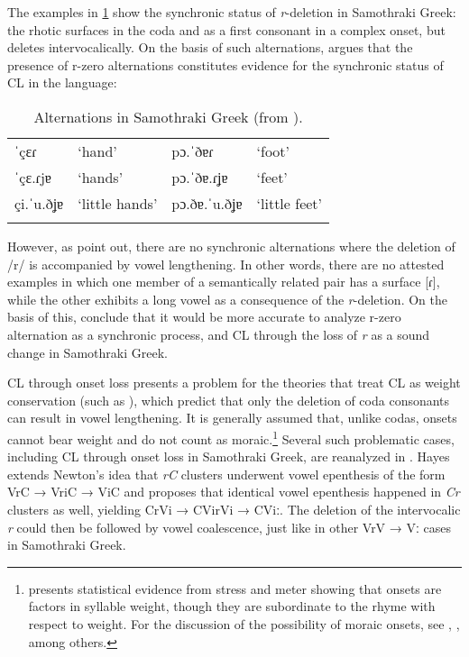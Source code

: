 \documentclass[output=paper,
modfonts
]{LSP/langsci}
\begin{document}
The examples in \cref{tab:samgkalt} show the synchronic status of \emph{r}-deletion in
Samothraki Greek: the rhotic surfaces in the coda and as a first
consonant in a complex onset, but deletes intervocalically. On the basis
of such alternations, \citet{kiparsky2011k} argues that the presence of r-zero
alternations constitutes evidence for the synchronic status of CL in the
language:

\begin{table}
\caption{Alternations in Samothraki Greek (from \citealt[7]{katsika2015}).}
\label{tab:samgkalt}
\begin{tabular}{llll}
	\lsptoprule
  ˈçɛɾ 	&	`hand'	&	 pɔ.ˈðɐɾ 		& `foot'\\
  ˈçɛ.ɾjɐ 	&	`hands'	&	 pɔ.ˈðɐ.ɾʝɐ 	& `feet'\\
  çi.ˈu.ðʝɐ 	&	`little hands' &	pɔ.ðɐ.ˈu.ðʝɐ 	& `little feet'\\
\lspbottomrule
 \end{tabular}
\end{table}
 
However, as \citet{katsika2015} point out, there are no
synchronic alternations where the deletion of /r/ is accompanied by
vowel lengthening. In other words, there are no attested examples in
which one member of a semantically related pair has a surface {[}ɾ{]},
while the other exhibits a long vowel as a consequence of the
\emph{r}-deletion. On the basis of this, \citet{katsika2015}
conclude that it would be more accurate to analyze r-zero alternation as
a synchronic process, and CL through the loss of \emph{r} as a sound
change in Samothraki Greek.

CL through onset loss presents a problem for the theories that treat CL
as weight conservation (such as \citealt{hayes1989k}), which predict that only the
deletion of coda consonants can result in vowel lengthening. It is
generally assumed that, unlike codas, onsets cannot bear weight and do
not count as moraic.\footnote{\citet{ryan2014} presents statistical evidence
  from stress and meter showing that onsets are factors in syllable
  weight, though they are subordinate to the rhyme with respect to
  weight. For the discussion of the possibility of moraic onsets, see
  \citet{curtis2003}, \citet{davis1999k}, among others.} Several such problematic
cases, including CL through onset loss in Samothraki Greek, are
reanalyzed in \citet{hayes1989k}. Hayes extends Newton's \citeyearpar{newton1972b} idea that
\emph{rC} clusters underwent vowel epenthesis of the form VrC → VriC →
ViC and proposes that identical vowel epenthesis happened in \emph{Cr}
clusters as well, yielding CrVi → CVirVi → CViː. The deletion of the
intervocalic \emph{r} could then be followed by vowel coalescence, just
like in other VrV → Vː cases in Samothraki Greek.
\end{document}
